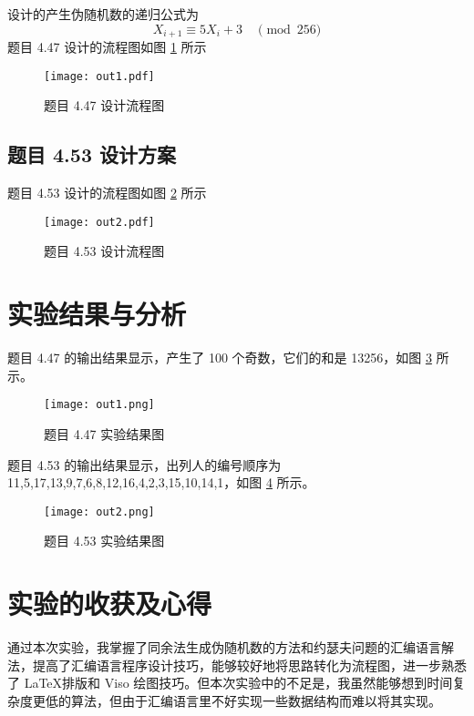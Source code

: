 \documentclass[12pt,AutoFakeBold]{article}
\begin{document}
设计的产生伪随机数的递归公式为
%
\begin{equation*}
X_{i+1}\equiv5X_i+3\quad\pmod {256}
\end{equation*}
%
题目 4.47 设计的流程图如图 \ref{pro:out1} 所示

\begin{figure}[hbtp]
	\centering
	\texttt{[image: out1.pdf]}
	\caption{题目 4.47 设计流程图}\label{pro:out1}
\end{figure}

\subsection{题目 4.53 设计方案}

题目 4.53 设计的流程图如图 \ref{pro:out2} 所示

\begin{figure}[hbtp]
	\centering
	\texttt{[image: out2.pdf]}
	\caption{题目 4.53 设计流程图}\label{pro:out2}
\end{figure}

\section{实验结果与分析}

题目 4.47 的输出结果显示，产生了 100 个奇数，它们的和是 13256，如图 \ref{fig:out1} 所示。

\begin{figure}[hbtp]
	\centering
	\texttt{[image: out1.png]}
	\caption{题目 4.47 实验结果图}\label{fig:out1}
\end{figure}

题目 4.53 的输出结果显示，出列人的编号顺序为 11,5,17,13,9,7,6,8,12,16,4,2,3,15,10,14,1，如图 \ref{fig:out2} 所示。

\begin{figure}[hbtp]
	\centering
	\texttt{[image: out2.png]}
	\caption{题目 4.53 实验结果图}\label{fig:out2}
\end{figure}

\section{实验的收获及心得}

通过本次实验，我掌握了同余法生成伪随机数的方法和约瑟夫问题的汇编语言解法，提高了汇编语言程序设计技巧，能够较好地将思路转化为流程图，进一步熟悉了 \LaTeX 排版和 Viso 绘图技巧。但本次实验中的不足是，我虽然能够想到时间复杂度更低的算法，但由于汇编语言里不好实现一些数据结构而难以将其实现。
\end{document}
